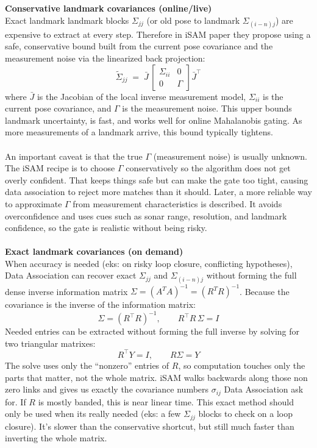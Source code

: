 \noindent
\textbf{Conservative landmark covariances (online/live)} 
\\ \noindent
Exact landmark landmark blocks $\Sigma_{jj}$ (or old pose to landmark $\Sigma_{(i-n)j}$) are expensive to extract at every step. Therefore in iSAM paper \cite{iSAM_paper} they propose using a safe, conservative bound built from the current pose covariance and the measurement noise via the linearized back projection:
$$
    \tilde\Sigma_{jj}
    \;=\;
    \bar J\,
    \begin{bmatrix}
    \Sigma_{ii} & 0\\[2pt]
    0 & \Gamma
    \end{bmatrix}
    \bar J^\top
$$
where $\bar J$ is the Jacobian of the local inverse measurement model, $\Sigma_{ii}$ is the current pose covariance, and $\Gamma$ is the measurement noise. This upper bounds landmark uncertainty, is fast, and works well for online Mahalanobis gating. As more measurements of a landmark arrive, this bound typically tightens.
\\ \\
An important caveat is that the true $\Gamma$ (measurement noise) is usually unknown. The iSAM recipe is to choose $\Gamma$ conservatively so the algorithm does not get overly confident. That keeps things safe but can make the gate too tight, causing data association to reject more matches than it should. Later, a more reliable way to approximate $\Gamma$ from measurement characteristics is described. It avoids overconfidence and uses cues such as sonar range, resolution, and landmark confidence, so the gate is realistic without being risky.
\\ \\
\textbf{Exact landmark covariances (on demand)} 
\\ \noindent
When accuracy is needed (eks: on risky loop closure, conflicting hypotheses), Data Association can recover exact $\Sigma_{jj}$ and $\Sigma_{(i-n)j}$ without forming the full dense inverse information matrix $\Sigma=(A^{T}A)^{-1}=(R^{T}R)^{-1}$. Because the covariance is the inverse of the information matrix:
$$
    \Sigma=(R^\top R)^{-1}, \qquad R^\top R\,\Sigma = I
$$
Needed entries can be extracted without forming the full inverse by solving for two triangular matrixes:
$$
R^\top Y = I, \qquad R \Sigma = Y
$$
The solve uses only the ``nonzero'' entries of $R$, so computation touches only the parts that matter, not the whole matrix. iSAM walks backwards along those non zero links and gives us exactly the covariance numbers $\sigma_{ij}$ Data Association ask for. If $R$ is mostly banded, this is near linear time. This exact method should only be used when its really needed (eks: a few $\Sigma_{jj}$ blocks to check on a loop closure). It's slower than the conservative shortcut, but still much faster than inverting the whole matrix.

